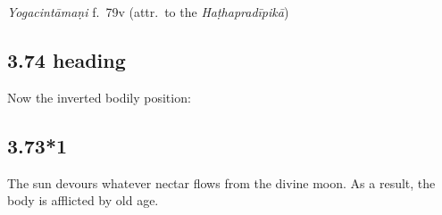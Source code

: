 \begin{ekdosis}
\begin{testimonia}[hp03_073]
\emph{Yogacintāmaṇi} f.~79v (attr.~to the \emph{Haṭhapradīpikā})
\begin{versinnote}
\end{versinnote}

\end{testimonia}




\subsection*{3.74 heading}
\begin{translation}[hp03_074a]
Now the inverted bodily position:
\end{translation}


\subsection*{3.73*1}
\begin{translation}[hp03_073_1]
The sun devours whatever nectar flows from the divine moon. As a result, the body is afflicted by old age.
\end{translation}



\end{ekdosis}
